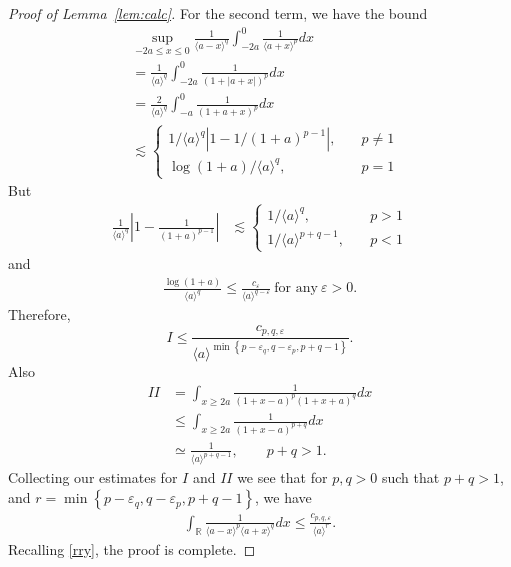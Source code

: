 \documentclass[12pt,reqno]{amsart}
\numberwithin{equation}{section}  %
\numberwithin{figure}{section}
\newcommand{\rr}{\mathbb{R}}
\newcommand{\ee}{\varepsilon}
\begin{document}
\begin{proof}[Proof of Lemma~\ref{lem:calc}]
%
For the second term, we have the bound
%
%
\begin{equation*}
\begin{split}
  & \sup_{-2a \le x \le 0} \frac{1}{\langle a - x \rangle
  ^{q}} \int_{-2a}^{0} \frac{1}{\langle a + x \rangle ^{p}} d x
  \\
  & = \frac{1}{\langle a \rangle ^{q}} \int_{-2a}^{0} \frac{1}{(1 + | a +
  x
  |)^{p}} d x 
  \\
  & = \frac{2}{\langle a \rangle ^{q}} \int_{-a}^{0} \frac{1}{(1 + a +
  x)^{p}} d x
  \\
  & \lesssim
  \begin{cases}
    1/{\langle a \rangle ^{q}} \left| 1 - 1/{(1 +
    a)^{p -1}} \right|, \quad & p \neq 1
    \\
    \log(1+a)/{\langle a \rangle^{q} }, \quad & p =1
  \end{cases}
  \end{split}
\end{equation*}
%
But
%
%
\begin{equation*}
\begin{split}
\frac{1}{\langle a \rangle ^{q}}\left| 1 - \frac{1}{(1 +
    a)^{p -1}} \right|
    & \lesssim
    \begin{cases}
      1/{\langle a \rangle ^{q}}, \quad & p > 1
      \\
      1/{\langle a \rangle ^{p + q -1}}, \quad & p < 1
    \end{cases}
\end{split}
\end{equation*}
%
%
and
%
%
\begin{equation*}
\begin{split}
  \frac{\log(1 + a)}{\langle a \rangle^{q} } \le  \frac{c_{\ee}}{\langle a
    \rangle ^{q - \ee}} \ \text{for any} \ \ee > 0.
\end{split}
\end{equation*}
%
%
%
Therefore,
\begin{equation*}
  I \le  \frac{c_{p,q, \ee}}{\langle a \rangle ^{\min\left\{ p-\ee_{q}, q -\ee_{p}, p + q-1 \right\}}}.
\end{equation*}
%
%
Also
%
%
\begin{equation*}
\begin{split}
  II 
    & = \int_{x \ge 2a} \frac{1}{(1 + x - a)^{p} (1 + x +
  a)^{q}} d x
  \\
  & \le \int_{x \ge 2a} \frac{1}{(1 + x -a)^{p+q}} d x
  \\
  & \simeq \frac{1}{\langle a \rangle^{p+q -1}}, \qquad p + q > 1.
\end{split}
\end{equation*}
%
%
Collecting our estimates for $I$ and $II$ we see that for 
$p, q > 0$ such that $p +q >1$, and $r =\min\left\{p -\ee_{q}, q - \ee_{p}, p+q-1
 \right\}$, we have
\begin{align*}
  \int_{\rr} \frac{1}{\langle a - x \rangle ^{p} \langle a + x \rangle
  ^{q}} d x
  \le \frac{c_{p,q, \ee}}{\langle a \rangle ^{r}}.
    \label{est-2}
\end{align*}
Recalling
\eqref{rry}, the proof is complete.
\end{proof}
\end{document}
